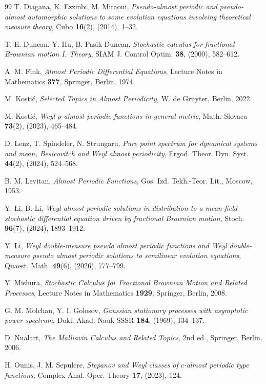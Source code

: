 \documentclass[11pt]{amsart}
\begin{document}
\begin{thebibliography}{99}
T. Diagana, K. Ezzinbi, M. Miraoui,
\emph{Pseudo-almost periodic and pseudo-almost automorphic solutions to some evolution equations involving theoretical measure theory},
Cubo \textbf{16}(2), (2014), 1--32.

T. E. Duncan, Y. Hu, B. Pasik-Duncan,
\emph{Stochastic calculus for fractional Brownian motion I. Theory},
SIAM J. Control Optim. \textbf{38}, (2000), 582--612.

A. M. Fink,
\emph{Almost Periodic Differential Equations},
Lecture Notes in Mathematics \textbf{377}, Springer, Berlin, 1974.

M. Kosti\'c,
\emph{Selected Topics in Almost Periodicity,}
W. de Gruyter, Berlin, 2022.

M. Kosti\'c,
\emph{Weyl $\rho$-almost periodic functions in general metric},
Math. Slovaca \textbf{73}(2), (2023), 465--484.

D. Lenz, T. Spindeler, N. Strungaru,
\emph{Pure point spectrum for dynamical systems and mean, Besicovitch and Weyl almost periodicity},
Ergod. Theor. Dyn. Syst. \textbf{44}(2), (2024), 524--568.

B. M. Levitan,
\emph{Almost Periodic Functions},
Gos. Izd. Tekh.-Teor. Lit., Moscow, 1953.

Y. Li, B. Li,
\emph{Weyl almost periodic solutions in distribution to a mean-field stochastic differential equation driven by fractional Brownian motion},
Stoch. \textbf{96}(7), (2024), 1893--1912.

Y. Li,
\emph{Weyl double-measure pseudo almost periodic functions and Weyl double-measure pseudo almost periodic solutions to semilinear evolution equations},
Quaest. Math. \textbf{49}(6), (2026), 777--799.

Y. Mishura,
\emph{Stochastic Calculus for Fractional Brownian Motion and Related Processes},
Lecture Notes in Mathematics \textbf{1929}, Springer, Berlin, 2008.

G. M. Molchan, Y. I. Golosov,
\emph{Gaussian stationary processes with asymptotic power spectrum},
Dokl. Akad. Nauk SSSR \textbf{184}, (1969), 134--137.

D. Nualart,
\emph{The Malliavin Calculus and Related Topics},
2nd ed., Springer, Berlin, 2006.

H. Ounis, J. M. Sepulcre,
\emph{Stepanov and Weyl classes of $c$-almost periodic type functions},
Complex Anal. Oper. Theory \textbf{17}, (2023), 124.


\end{thebibliography}
\end{document}
